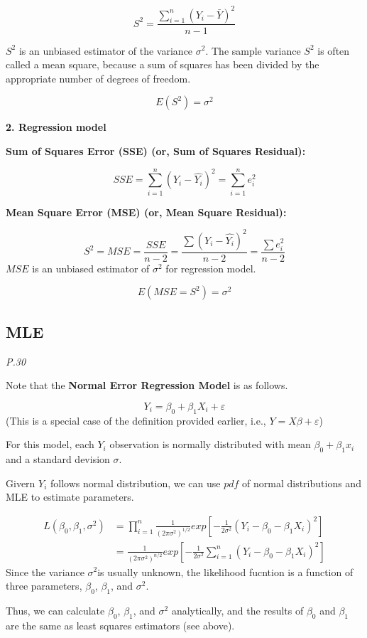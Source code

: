 \documentclass[]{book}
\begin{document}
\[S^2= \frac{\sum_{i=1}^n (Y_i-\bar{Y})^2}{n-1}\]

\(S^2\) is an unbiased estimator of the variance \(\sigma^2\). The sample variance \(S^2\) is often called a mean square, because a sum of squares has been divided by the appropriate number of degrees of freedom.

\[E(S^2)=\sigma^2\]

\textbf{2. Regression model}

\textbf{Sum of Squares Error (SSE) (or, Sum of Squares Residual): }

\[SSE=\sum_{i=1}^n (Y_i-\hat{Y_i})^2=\sum_{i=1}^n e_i^2\]

\textbf{Mean Square Error (MSE) (or, Mean Square Residual):}

\[S^2=MSE=\frac{SSE}{n-2}=\frac{\sum(Y_i-\hat{Y_i})^2}{n-2}=\frac{\sum e_i^2}{n-2}\]
\(MSE\) is an unbiased estimator of \(\sigma^2\) for regression model.

\[E(MSE=S^2)=\sigma^2\]

\hypertarget{mle}{%
\subsection{MLE}\label{mle}}

\emph{P.30}

Note that the \textbf{Normal Error Regression Model} is as follows.

\[Y_i=\beta_0+\beta_1X_i +\varepsilon\]
(This is a special case of the definition provided earlier, i.e., \(Y=X\beta +\varepsilon\))

For this model, each \(Y_i\) observation is normally distributed with mean \(\beta_0+\beta_1x_i\) and a standard devision \(\sigma\).

Givern \(Y_i\) follows normal distribution, we can use \(pdf\) of normal distributions and MLE to estimate parameters.

\[\begin{aligned} L(\beta_0,\beta_1,\sigma^2) &=\prod_{i=1}^n \frac{1}{(2\pi \sigma^2)^{1/2}}exp[-\frac{1}{2 \sigma^2}(Y_i-\beta_0-\beta_1X_i)^2] \\ &=\frac{1}{(2\pi \sigma^2)^{n/2}}exp[-\frac{1}{2 \sigma^2}\sum_{i=1}^n(Y_i-\beta_0-\beta_1X_i)^2]  \end{aligned}\]
Since the variance \(\sigma^2\)is usually unknown, the likelihood fucntion is a function of three parameters, \(\beta_0\), \(\beta_1\), and \(\sigma^2\).

Thus, we can calculate \(\beta_0\), \(\beta_1\), and \(\sigma^2\) analytically, and the results of \(\beta_0\) and \(\beta_1\) are the same as least squares estimators (see above).
\end{document}
